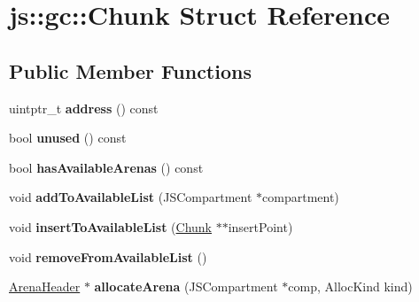 \hypertarget{structjs_1_1gc_1_1_chunk}{\section{js\-:\-:gc\-:\-:Chunk Struct Reference}
\label{structjs_1_1gc_1_1_chunk}
}
\subsection*{Public Member Functions}
\begin{DoxyCompactItemize}
\item 
\hypertarget{structjs_1_1gc_1_1_chunk_a131d38aac05dc13be8867726974ddeeb}{uintptr\-\_\-t {\bfseries address} () const }\label{structjs_1_1gc_1_1_chunk_a131d38aac05dc13be8867726974ddeeb}

\item 
\hypertarget{structjs_1_1gc_1_1_chunk_a4a4fd0008ac116146a22b7b30d8401ec}{bool {\bfseries unused} () const }\label{structjs_1_1gc_1_1_chunk_a4a4fd0008ac116146a22b7b30d8401ec}

\item 
\hypertarget{structjs_1_1gc_1_1_chunk_a60ddab1f056036f51c5afdc3789f8a71}{bool {\bfseries has\-Available\-Arenas} () const }\label{structjs_1_1gc_1_1_chunk_a60ddab1f056036f51c5afdc3789f8a71}

\item 
\hypertarget{structjs_1_1gc_1_1_chunk_a9035472e84d2948fb0fb37b20fe45600}{void {\bfseries add\-To\-Available\-List} (J\-S\-Compartment $\ast$compartment)}\label{structjs_1_1gc_1_1_chunk_a9035472e84d2948fb0fb37b20fe45600}

\item 
\hypertarget{structjs_1_1gc_1_1_chunk_a50fe12e2ba5edec503da8e7ab7f3f84f}{void {\bfseries insert\-To\-Available\-List} (\hyperlink{structjs_1_1gc_1_1_chunk}{Chunk} $\ast$$\ast$insert\-Point)}\label{structjs_1_1gc_1_1_chunk_a50fe12e2ba5edec503da8e7ab7f3f84f}

\item 
\hypertarget{structjs_1_1gc_1_1_chunk_a9de4a54122a34684b08a7acb09b60c5c}{void {\bfseries remove\-From\-Available\-List} ()}\label{structjs_1_1gc_1_1_chunk_a9de4a54122a34684b08a7acb09b60c5c}

\item 
\hypertarget{structjs_1_1gc_1_1_chunk_a66a5c588bba958d2d78baa12cece5ef6}{\hyperlink{structjs_1_1gc_1_1_arena_header}{Arena\-Header} $\ast$ {\bfseries allocate\-Arena} (J\-S\-Compartment $\ast$comp, Alloc\-Kind kind)}\label{structjs_1_1gc_1_1_chunk_a66a5c588bba958d2d78baa12cece5ef6}


\end{DoxyCompactItemize}
